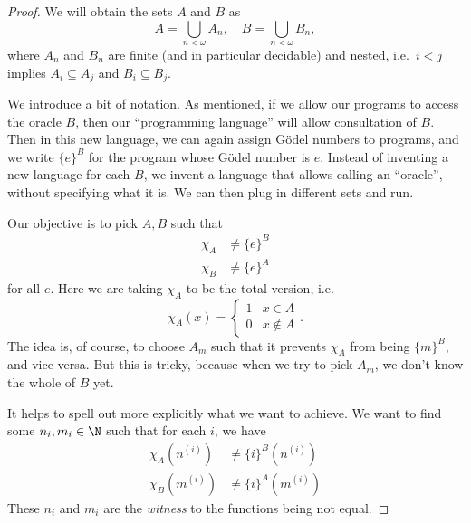 \documentclass[a4paper]{article}
\begin{document}
\begin{proof} %
  We will obtain the sets $A$ and $B$ as
  \[
    A = \bigcup_{n < \omega} A_n,\quad B = \bigcup_{n < \omega} B_n,
  \]
  where $A_n$ and $B_n$ are finite (and in particular decidable) and nested, i.e.\ $i < j$ implies $A_i \subseteq A_j$ and $B_i \subseteq B_j$.


  We introduce a bit of notation. As mentioned, if we allow our programs to access the oracle $B$, then our ``programming language'' will allow consultation of $B$. Then in this new language, we can again assign G\"odel numbers to programs, and we write $\{e\}^B$ for the program whose G\"odel number is $e$. Instead of inventing a new language for each $B$, we invent a language that allows calling an ``oracle'', without specifying what it is. We can then plug in different sets and run.

  Our objective is to pick $A, B$ such that
  \begin{align*}
    \chi_A &\not= \{e\}^B\\
    \chi_B &\not= \{e\}^A
  \end{align*}
  for all $e$. Here we are taking $\chi_A$ to be the total version, i.e.
  \[
    \chi_A(x) =
    \begin{cases}
      1 & x \in A\\
      0 & x \not\in A
    \end{cases}.
  \]
  The idea is, of course, to choose $A_m$ such that it prevents $\chi_A$ from being $\{m\}^B$, and vice versa. But this is tricky, because when we try to pick $A_m$, we don't know the whole of $B$ yet.

  It helps to spell out more explicitly what we want to achieve. We want to find some $n_i, m_i \in \N$ such that for each $i$, we have
  \begin{align*}
    \chi_A(n^{(i)}) &\not= \{i\}^B(n^{(i)})\\
    \chi_B(m^{(i)}) &\not= \{i\}^A(m^{(i)})
  \end{align*}
  These $n_i$ and $m_i$ are the \emph{witness} to the functions being not equal.


\end{proof}
\end{document}
